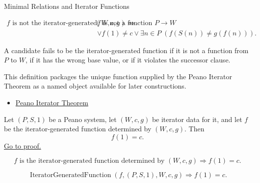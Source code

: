 \begin{topicbox}{Minimal Relations and Iterator Functions}
\begin{remark*}
\[
\begin{aligned}
f \text{ is not the iterator-generated function determined by } (W,c,g)
\Longleftrightarrow\;&
f \text{ is not a function } P\to W\\
&\lor f(1)\neq c
\lor \exists n\in P\;(f(S(n))\neq g(f(n))).
\end{aligned}
\]
\end{remark*}

\begin{remark*}
A candidate fails to be the iterator-generated function if it is not a
function from $P$ to $W$, if it has the wrong base value, or if it violates
the successor clause.
\end{remark*}

\begin{remark*}[Interpretation]
This definition packages the unique function supplied by the Peano Iterator
Theorem as a named object available for later constructions.
\end{remark*}

\begin{remark*}[Dependencies]
\begin{itemize}
  \item \hyperref[thm:peano-iterator-theorem]{Peano Iterator Theorem}
\end{itemize}
\end{remark*}

\begin{tcolorbox}[colback=thmbox, colframe=thmborder, arc=2pt,
  left=6pt, right=6pt, top=4pt, bottom=4pt,
  title={\small\textbf{Theorem (Iterator Base Clause)}},
  fonttitle=\small\bfseries]
\begin{theorem}
\label{thm:iterator-base-value}
Let $(P,S,1)$ be a Peano system, let $(W,c,g)$ be iterator data for it, and let
$f$ be the iterator-generated function determined by $(W,c,g)$. Then
\[
f(1)=c.
\]
\hyperref[prf:iterator-base-value]{Go to proof.}
\end{theorem}
\end{tcolorbox}

\begin{remark*}
\[
f \text{ is the iterator-generated function determined by } (W,c,g)
\Longrightarrow f(1)=c.
\]
\end{remark*}

\begin{remark*}
\[
\operatorname{IteratorGeneratedFunction}(f,(P,S,1),W,c,g)
\Longrightarrow f(1)=c.
\]
\end{remark*}


\end{topicbox}

